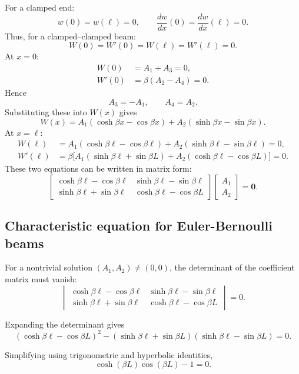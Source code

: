 \documentclass[11pt,a4paper]{article}
\begin{document}
For a clamped end:
\[
      w(0)=w(\ell)= 0, \qquad \frac{dw}{dx} (0)=\frac{dw}{dx} (\ell)= 0.
\]
Thus, for a clamped--clamped beam:
\[
      W(0) = W'(0) = W(\ell) = W'(\ell) = 0.
\]
At $x=0$:
\[
      \begin{aligned}
            W(0)  & = A_1 + A_3 = 0,        \\
            W'(0) & = \beta(A_2 - A_4) = 0.
      \end{aligned}
\]
Hence
\[
      A_3 = -A_1, \qquad A_4 = A_2.
\]
Substituting these into $W(x)$ gives
\[
      W(x) = A_1(\cosh\beta x - \cos\beta x)
      + A_2(\sinh\beta x - \sin\beta x).
\]
At $x=\ell$:
\[
      \begin{aligned}
            W(\ell)  & = A_1(\cosh\beta\ell- \cos\beta \ell)
            + A_2(\sinh\beta\ell- \sin\beta \ell) = 0,              \\[4pt]
            W'(\ell) & = \beta\Big[A_1(\sinh\beta\ell+ \sin\beta L)
                  + A_2(\cosh\beta\ell- \cos\beta L)\Big] = 0.
      \end{aligned}
\]
These two equations can be written in matrix form:
\[
      \begin{bmatrix}
            \cosh\beta\ell- \cos\beta\ell & \sinh\beta\ell- \sin\beta\ell \\
            \sinh\beta\ell+ \sin\beta\ell & \cosh\beta\ell- \cos\beta L
      \end{bmatrix}
      \begin{bmatrix}
            A_1 \\[3pt] A_2
      \end{bmatrix}
      = \bm{0}.
\]

\subsection{Characteristic equation for Euler-Bernoulli beams}
For a nontrivial solution $(A_1, A_2) \neq (0,0)$, the determinant of the
coefficient matrix must vanish:
\[
      \begin{vmatrix}
            \cosh\beta\ell- \cos\beta\ell & \sinh\beta\ell- \sin\beta\ell \\
            \sinh\beta\ell+ \sin\beta\ell & \cosh\beta\ell- \cos\beta L
      \end{vmatrix} = 0.
\]

Expanding the determinant gives
\[
      (\cosh\beta\ell- \cos\beta L)^2
      - (\sinh\beta\ell+ \sin\beta L)(\sinh\beta\ell- \sin\beta L) = 0.
\]

Simplifying using trigonometric and hyperbolic identities,
\[
      \boxed{\cosh(\beta L)\cos(\beta L) - 1 = 0.}
\]
\end{document}
